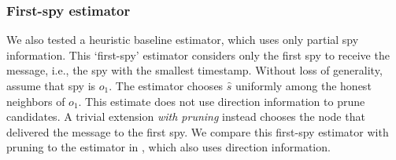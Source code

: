 \subsubsection{First-spy estimator}
We also tested a heuristic baseline estimator, which uses only partial spy information. This `first-spy' estimator considers only the first spy to receive the message, i.e., the spy with the smallest timestamp. Without loss of generality, assume that spy is $o_1$. The estimator chooses $\hat s$ uniformly among the honest neighbors of $o_1$. This estimate does not use direction information to prune candidates. A trivial extension \emph{with pruning} instead chooses the node that delivered the message to the first spy. We compare this first-spy estimator with pruning to the estimator in \cite{pinto}, which also uses direction information. 
